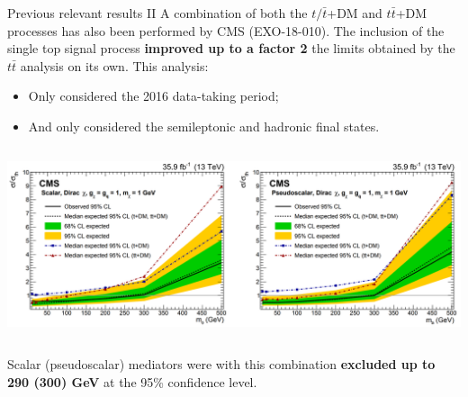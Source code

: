 \documentclass[8pt]{beamer}
\begin{document}
\begin{frame}{Previous relevant results II}
\justifying
\vspace{5pt}
A \alert{combination of both the $t/ \bar t$+DM and $t \bar t$+DM processes} has also been performed by CMS (EXO-18-010). The inclusion of the single top signal process \textbf{improved up to a factor 2} the limits obtained by the $t \bar t$ analysis on its own. This analysis: %

\begin{itemize}
\item Only considered the 2016 data-taking period;
\item And only considered the semileptonic and hadronic final states.
\end{itemize} \vfill

\begin{center}
\begin{columns}
	\begin{column}{1.0\textwidth}
		\begin{center}
			\includegraphics[width=1.0\textwidth]{figs/limitsprevious.png}
    		 \end{center}
	\end{column} \hfill
\end{columns}
\end{center} \vfill

Scalar (pseudoscalar) mediators were with this combination \textbf{excluded up to 290 (300) GeV} at the 95\% confidence level. \vfill %
\end{frame}
\end{document}
